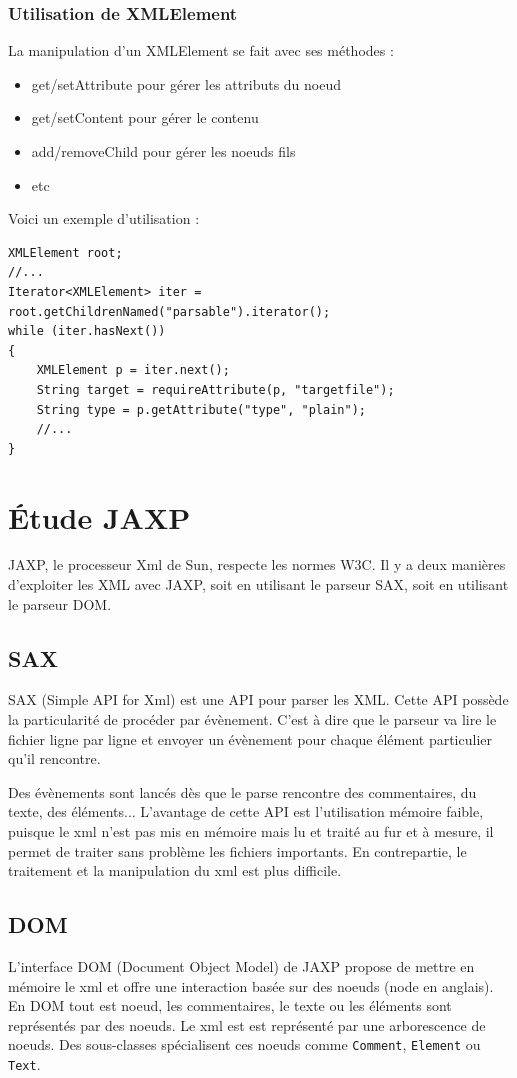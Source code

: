 \subsubsection{Utilisation de XMLElement}
La manipulation d'un XMLElement se fait avec ses méthodes :
\begin{itemize}
	\item get/setAttribute pour gérer les attributs du noeud
	\item get/setContent pour gérer le contenu
	\item add/removeChild pour gérer les noeuds fils
	\item etc
\end{itemize}
Voici un exemple d'utilisation :
\begin{lstlisting}
XMLElement root;
//...
Iterator<XMLElement> iter = root.getChildrenNamed("parsable").iterator();
while (iter.hasNext())
{
	XMLElement p = iter.next();
	String target = requireAttribute(p, "targetfile");
	String type = p.getAttribute("type", "plain");
	//...
}
\end{lstlisting}
\section{Étude JAXP}
JAXP, le processeur Xml de Sun, respecte les normes W3C.
Il y a deux manières d'exploiter les XML avec JAXP, soit en utilisant le parseur SAX, soit en utilisant le parseur DOM.
\subsection{SAX}
SAX (Simple API for Xml) est une API pour parser les XML.
Cette API possède la particularité de procéder par évènement.
C'est à dire que le parseur va lire le fichier ligne par ligne et envoyer un évènement pour chaque élément particulier qu'il rencontre.

Des évènements sont lancés dès que le parse rencontre des commentaires, du texte, des éléments...
L'avantage de cette API est l'utilisation mémoire faible, puisque le xml n'est pas mis en mémoire mais lu et traité au fur et à mesure, il permet de traiter sans problème les fichiers importants.
En contrepartie, le traitement et la manipulation du xml est plus difficile.
\subsection{DOM}
L'interface DOM (Document Object Model) de JAXP propose de mettre en mémoire le xml et offre une interaction basée sur des noeuds (node en anglais).
En DOM tout est noeud, les commentaires, le texte ou les éléments sont représentés par des noeuds.
Le xml est est représenté par une arborescence de noeuds.
Des sous-classes spécialisent ces noeuds comme \verb|Comment|, \verb|Element| ou \verb|Text|.

